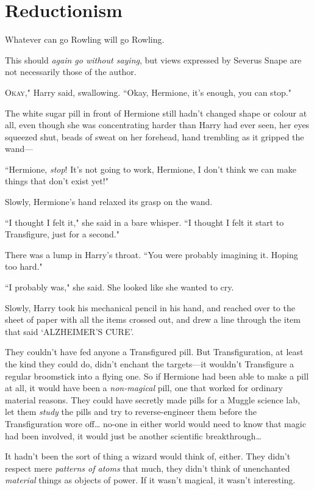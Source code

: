 \chapter{Reductionism}

\begin{chapterOpeningAuthorNote}
Whatever can go Rowling will go Rowling.

This should \emph{again go without saying}, but views expressed by Severus Snape are not necessarily those of the author.
\end{chapterOpeningAuthorNote}

\lettrine[ante=``]{O}{kay}," Harry said, swallowing. ``Okay, Hermione, it's enough, you can stop."

The white sugar pill in front of Hermione still hadn't changed shape or colour at all, even though she was concentrating harder than Harry had ever seen, her eyes squeezed shut, beads of sweat on her forehead, hand trembling as it gripped the wand—

``Hermione, \emph{stop}! It's not going to work, Hermione, I don't think we can make things that don't exist yet!"

Slowly, Hermione's hand relaxed its grasp on the wand.

``I thought I felt it," she said in a bare whisper. ``I thought I felt it start to Transfigure, just for a second."

There was a lump in Harry's throat. ``You were probably imagining it. Hoping too hard."

``I probably was," she said. She looked like she wanted to cry.

Slowly, Harry took his mechanical pencil in his hand, and reached over to the sheet of paper with all the items crossed out, and drew a line through the item that said `ALZHEIMER'S CURE'.

They couldn't have fed anyone a Transfigured pill. But Transfiguration, at least the kind they could do, didn't enchant the targets—it wouldn't Transfigure a regular broomstick into a flying one. So if Hermione had been able to make a pill at all, it would have been a \emph{non-magical} pill, one that worked for ordinary material reasons. They could have secretly made pills for a Muggle science lab, let them \emph{study} the pills and try to reverse-engineer them before the Transfiguration wore off{\ldots} no-one in either world would need to know that magic had been involved, it would just be another scientific breakthrough{\ldots}

It hadn't been the sort of thing a wizard would think of, either. They didn't respect mere \emph{patterns of atoms} that much, they didn't think of unenchanted \emph{material} things as objects of power. If it wasn't magical, it wasn't interesting.

